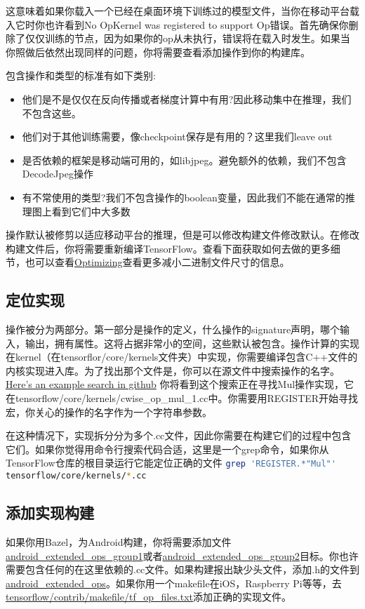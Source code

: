 这意味着如果你载入一个已经在桌面环境下训练过的模型文件，当你在移动平台载入它时你也许看到No OpKernel was  registered to support Op错误。首先确保你删除了仅仅训练的节点，因为如果你的op从未执行，错误将在载入时发生。如果当你照做后依然出现同样的问题，你将需要查看添加操作到你的构建库。

包含操作和类型的标准有如下类别:
\begin{itemize}
	\item 他们是不是仅仅在反向传播或者梯度计算中有用?因此移动集中在推理，我们不包含这些。
	\item 他们对于其他训练需要，像checkpoint保存是有用的？这里我们leave out 
	\item 是否依赖的框架是移动端可用的，如libjpeg。避免额外的依赖，我们不包含DecodeJpeg操作
	\item 有不常使用的类型?我们不包含操作的boolean变量，因此我们不能在通常的推理图上看到它们中大多数
\end{itemize}
操作默认被修剪以适应移动平台的推理，但是可以修改构建文件修改默认。在修改构建文件后，你将需要重新编译TensorFlow。查看下面获取如何去做的更多细节，也可以查看\href{https://www.tensorflow.org/mobile/optimizing?hl=zh-cn#binary_size}{Optimizing}查看更多减小二进制文件尺寸的信息。
\subsection{定位实现}
操作被分为两部分。第一部分是操作的定义，什么操作的signature声明，哪个输入，输出，拥有属性。这将占据非常小的空间，这些默认被包含。操作计算的实现在kernel（在tensorflor/core/kernels文件夹）中实现，你需要编译包含C++文件的内核实现进入库。为了找出那个文件是，你可以在源文件中搜索操作的名字。
\href{https://github.com/search?utf8=%E2%9C%93&q=repo%3Atensorflow%2Ftensorflow+extension%3Acc+path%3Atensorflow%2Fcore%2Fkernels+REGISTER+Mul&type=Code&ref=searchresults}{Here’s an example search in github}
你将看到这个搜索正在寻找Mul操作实现，它在tensorflow/core/kernels/cwise\_op\_mul\_1.cc中。你需要用REGISTER开始寻找宏，你关心的操作的名字作为一个字符串参数。

在这种情况下，实现拆分分为多个.cc文件，因此你需要在构建它们的过程中包含它们。如果你觉得用命令行搜索代码合适，这里是一个grep命令，如果你从TensorFlow仓库的根目录运行它能定位正确的文件
\lstinline[language=Bash]{grep 'REGISTER.*"Mul"' tensorflow/core/kernels/*.cc}
\subsection{添加实现构建}
如果你用Bazel，为Android构建，你将需要添加文件\href{https://www.github.com/tensorflow/tensorflow/blob/r1.4/tensorflow/core/kernels/BUILD#L3565}{android\_extended\_ops\_group1}或者\href{https://www.github.com/tensorflow/tensorflow/blob/r1.4/tensorflow/core/kernels/BUILD#L3632}{android\_extended\_ops\_group2}目标。你也许需要包含任何的在这里依赖的.cc文件。如果构建报出缺少头文件，添加.h的文件到\href{https://www.github.com/tensorflow/tensorflow/blob/r1.4/tensorflow/core/kernels/BUILD#L3525}{android\_extended\_ops}。如果你用一个makefile在iOS，Raspberry Pi等等，去\href{https://www.github.com/tensorflow/tensorflow/blob/r1.4/tensorflow/contrib/makefile/tf_op_files.txt}{tensorflow/contrib/makefile/tf\_op\_files.txt}添加正确的实现文件。
